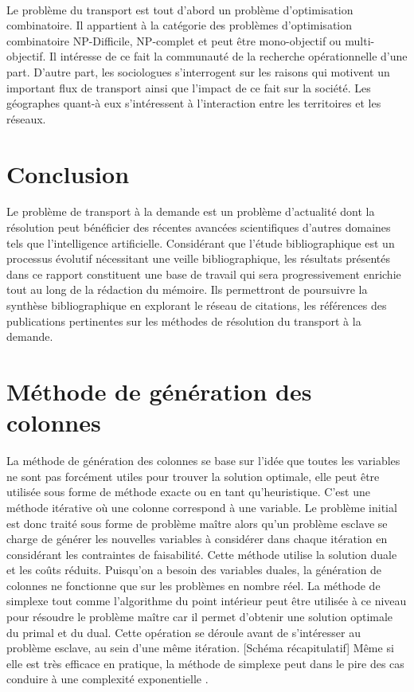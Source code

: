 \documentclass{article}
\begin{document}
\paragraph{}
Le problème du transport est tout d'abord un problème d'optimisation combinatoire. Il appartient à la catégorie des problèmes d’optimisation combinatoire NP-Difficile, NP-complet et peut être mono-objectif ou multi-objectif. Il intéresse de ce fait la communauté de la recherche opérationnelle d'une part. D'autre part, les sociologues s'interrogent sur les raisons qui motivent un important flux de transport ainsi que l'impact de ce fait sur la société. Les géographes quant-à eux s'intéressent à l'interaction entre les territoires et les réseaux.


\section{Conclusion}

Le problème de transport à la demande est un problème d'actualité dont la résolution peut bénéficier des récentes avancées scientifiques d'autres domaines tels que l'intelligence artificielle. Considérant que l'étude bibliographique est un processus évolutif nécessitant une veille bibliographique, les résultats présentés dans ce rapport constituent une base de travail qui sera progressivement enrichie tout au long de la rédaction du mémoire. Ils permettront de poursuivre la synthèse bibliographique en explorant le réseau de citations, les références des publications pertinentes sur les méthodes de résolution du transport à la demande.

\section{Méthode de génération des colonnes}
La méthode de génération des colonnes se base sur l'idée que toutes les variables ne sont pas forcément utiles pour trouver la solution optimale, elle peut être utilisée sous forme de méthode exacte ou en tant qu'heuristique. C'est une méthode itérative où une colonne correspond à une variable. Le problème initial est donc traité sous forme de problème maître alors qu'un problème esclave se charge de générer les nouvelles variables à considérer dans chaque itération en considérant les contraintes de faisabilité. Cette méthode utilise la solution duale et les coûts réduits. Puisqu'on a besoin des variables duales, la génération de colonnes ne fonctionne que sur les problèmes en nombre réel. La méthode de simplexe tout comme l'algorithme du point intérieur peut être utilisée à ce niveau pour résoudre le problème maître car il permet d'obtenir une solution optimale du primal et du dual. Cette opération se déroule avant de s'intéresser au problème esclave, au sein d'une même itération. [Schéma récapitulatif] Même si elle est très efficace en pratique, la méthode de simplexe peut dans le pire des cas conduire à une complexité exponentielle \cite{Simplex}.
\end{document}
